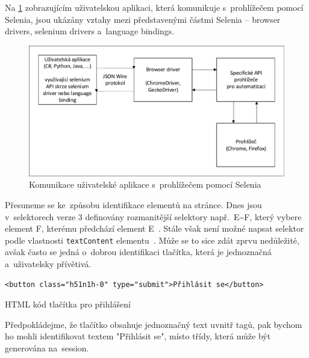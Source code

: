 \documentclass[12pt, a4paper, twoside]{article}
\newcommand{\codefigureSpacing}{1.2}
\begin{document}
	\newpage
	\noindent Na \cref{fig:seleniumCommunication} zobrazujícím uživatelskou aplikaci, která komunikuje s~prohlížečem pomocí Selenia, jsou ukázány vztahy mezi představenými částmi Selenia -- browser drivers, selenium drivers a~language bindings.
	\nopagebreak
	\begin{figure}[H]
		\centering
		\includegraphics[width=1.0\textwidth]{seleniumCom.pdf}
		\caption{Komunikace uživatelské aplikace s~prohlížečem pomocí Selenia}
		\label{fig:seleniumCommunication}
	\end{figure}

	\noindent Přesuneme se ke~způsobu identifikace elementů na stránce. Dnes jsou v~selektorech verze 3 definovány rozmanitější selektory např.~E\textasciitilde F, který vybere element F, kterému předchází element E~\cite{selectors3W3c}. Stále však není možné napsat selektor podle vlastnosti \texttt{textContent} elementu~\cite{selectors4W3c}. Může se to sice zdát zprvu nedůležité, avšak často se jedná o~dobrou identifikaci tlačítka, která je jednoznačná a~uživatelsky přívětivá.
	\begin{codefigure}[H]
		\renewcommand\baselinestretch{\codefigureSpacing}
		\begin{lstlisting}[style=MyHTML]
<button class="h51n1h-0" type="submit">Přihlásit se</button>
		\end{lstlisting}
		\caption{HTML kód tlačítka pro přihlášení}
		\label{codefig:loginButton}
	\end{codefigure}
	Předpokládejme, že tlačítko obsahuje jednoznačný text uvnitř tagů, pak bychom ho mohli identifikovat textem "Přihlásit se", místo třídy, která může být generována na~session.
	
\end{document}
